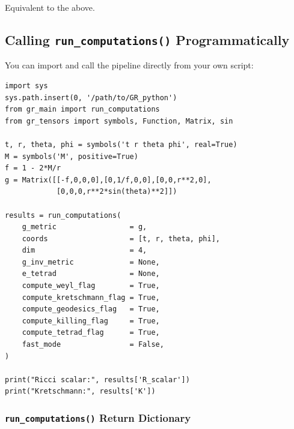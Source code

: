 \documentclass[11pt,a4paper]{article}
\newcommand{\code}[1]{\texttt{\small#1}}
\begin{document}
Equivalent to the above.

\subsection{Calling \code{run\_computations()} Programmatically}

You can import and call the pipeline directly from your own script:

\begin{lstlisting}
import sys
sys.path.insert(0, '/path/to/GR_python')
from gr_main import run_computations
from gr_tensors import symbols, Function, Matrix, sin

t, r, theta, phi = symbols('t r theta phi', real=True)
M = symbols('M', positive=True)
f = 1 - 2*M/r
g = Matrix([[-f,0,0,0],[0,1/f,0,0],[0,0,r**2,0],
            [0,0,0,r**2*sin(theta)**2]])

results = run_computations(
    g_metric                 = g,
    coords                   = [t, r, theta, phi],
    dim                      = 4,
    g_inv_metric             = None,
    e_tetrad                 = None,
    compute_weyl_flag        = True,
    compute_kretschmann_flag = True,
    compute_geodesics_flag   = True,
    compute_killing_flag     = True,
    compute_tetrad_flag      = True,
    fast_mode                = False,
)

print("Ricci scalar:", results['R_scalar'])
print("Kretschmann:", results['K'])
\end{lstlisting}

\subsubsection*{\code{run\_computations()} Return Dictionary}
\end{document}
